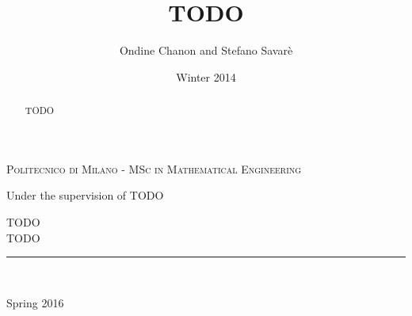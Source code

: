 \documentclass[letter,11pt]{article}
\title{TODO} %
\author{Ondine Chanon and Stefano Savarè} %
\date{Winter 2014}
\begin{document}
\begin{titlepage}


\begin{center}
\textsc{Politecnico di Milano - MSc in Mathematical Engineering}

Under the supervision of TODO
\end{center}

\vfill


\begin{center}
\begin{Huge}
TODO\\ 
\vspace{3mm}
TODO
\end{Huge}
\end{center}

\noindent\rule{\linewidth}{2pt}

\vspace{5mm}


~\vspace{1cm}


\vfill

\begin{center}
Spring 2016
\end{center}

\end{titlepage}

~\vfill
\thispagestyle{empty}
\begin{abstract}
TODO
\end{abstract}

\vfill 

\tableofcontents

~\vfill

%






%


\vfill


\end{document}
